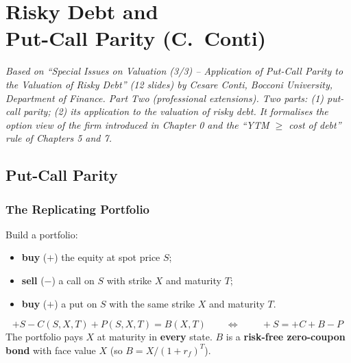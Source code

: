 \chapter[Risky Debt and Put-Call Parity (C.\ Conti)]{Risky Debt and\\Put-Call Parity (C.\ Conti)}\label{ch:riskydebt}

\emph{Based on ``Special Issues on Valuation (3/3) -- Application of Put-Call Parity to the Valuation of Risky Debt'' (12 slides) by Cesare Conti, Bocconi University, Department of Finance. Part Two (professional extensions). Two parts: (1) put-call parity; (2) its application to the valuation of risky debt. It formalises the option view of the firm introduced in Chapter 0 and the ``YTM $\geq$ cost of debt'' rule of Chapters 5 and 7.}

\providecommand{\inpractice}[1]{\par\smallskip\noindent{\small\textcolor{keyred}{\textbf{In practice}}\quad\emph{#1}}\par\smallskip}

\section{Put-Call Parity}

\subsection{The Replicating Portfolio}
Build a portfolio:
\begin{itemize}
  \item \textbf{buy} ($+$) the equity at spot price $S$;
  \item \textbf{sell} ($-$) a call on $S$ with strike $X$ and maturity $T$;
  \item \textbf{buy} ($+$) a put on $S$ with the same strike $X$ and maturity $T$.
\end{itemize}
\begin{keybox}
\[
+S-C(S,X,T)+P(S,X,T)=B(X,T)\qquad\Longleftrightarrow\qquad \boxed{\,+S=+C+B-P\,}
\]
The portfolio pays $X$ at maturity in \textbf{every} state. $B$ is a \textbf{risk-free zero-coupon bond} with face value $X$ (so $B=X/(1+r_f)^T$).
\end{keybox}

